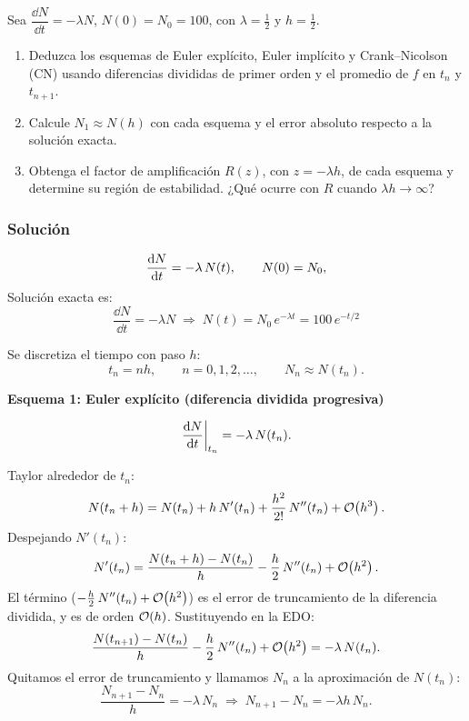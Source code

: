 
\begin{enunciado}
	Sea $\dfrac{\dd N}{\dd t} = -\lambda N$, $N(0) = N_0 = 100$, con $\lambda = \tfrac12$ y $h = \tfrac12$.
	\begin{enumerate}[label=(\alph*)]
		\item Deduzca los esquemas de Euler explícito, Euler implícito y Crank--Nicolson (CN)
		usando diferencias divididas de primer orden y el promedio de $f$ en $t_n$ y $t_{n+1}$.
		\item Calcule $N_1 \approx N(h)$ con cada esquema y el error absoluto respecto a la solución exacta.
		\item Obtenga el factor de amplificación $R(z)$, con $z = -\lambda h$, de cada esquema y
		determine su región de estabilidad. ¿Qué ocurre con $R$ cuando $\lambda h \to \infty$?
	\end{enumerate}
\end{enunciado}

\subsubsection*{Solución}
\[
\frac{\mathrm{d} N}{\mathrm{d} t} = -\lambda\,N(t), \qquad N(0) 	= N_0,
\]
Solución exacta es:
\[
\frac{\dd N}{\dd t} = -\lambda N
\;\Longrightarrow\; N(t) = N_0\,e^{-\lambda t} = 100\,e^{-t/2}
\]



Se discretiza el tiempo con paso $h$:
\[
t_n = n h, \qquad n = 0, 1, 2, \dots, \qquad N_n \approx N(t_n).
\]

\textbf{Esquema 1: Euler explícito (diferencia dividida progresiva)}

\[
\left.\frac{\mathrm{d} N}{\mathrm{d} t}\right|_{t_n} = -\lambda\,N(t_n).
\]

Taylor alrededor de $t_n$:
\[
N(t_n + h) = N(t_n) + h\,N'(t_n) + \frac{h^2}{2!}\,N''(t_n) + \mathcal{O}\!\left(h^3\right).
\]
Despejando $N'(t_n)$:
\[
N'(t_n) = \frac{N(t_n + h) - N(t_n)}{h} - \frac{h}{2}\,N''(t_n) + \mathcal{O}\!\left(h^2\right).
\]
El término ($-\frac{h}{2}\,N''(t_n) + \mathcal{O}\!\left(h^2\right)$) es el error de truncamiento de la diferencia
dividida, y es de orden $\mathcal{O}\!\left(h\right)$. Sustituyendo en la EDO:
\[
\frac{N(t_{n+1}) - N(t_n)}{h} - \frac{h}{2}\,N''(t_n) + \mathcal{O}\!\left(h^2\right) = -\lambda\,N(t_n).
\]
Quitamos el error de truncamiento y llamamos $N_n$ a la aproximación de $N(t_n)$:
\[
\frac{N_{n+1} - N_n}{h} = -\lambda\,N_n
\;\Longrightarrow\;
N_{n+1} - N_n = -\lambda h\,N_n .
\]


